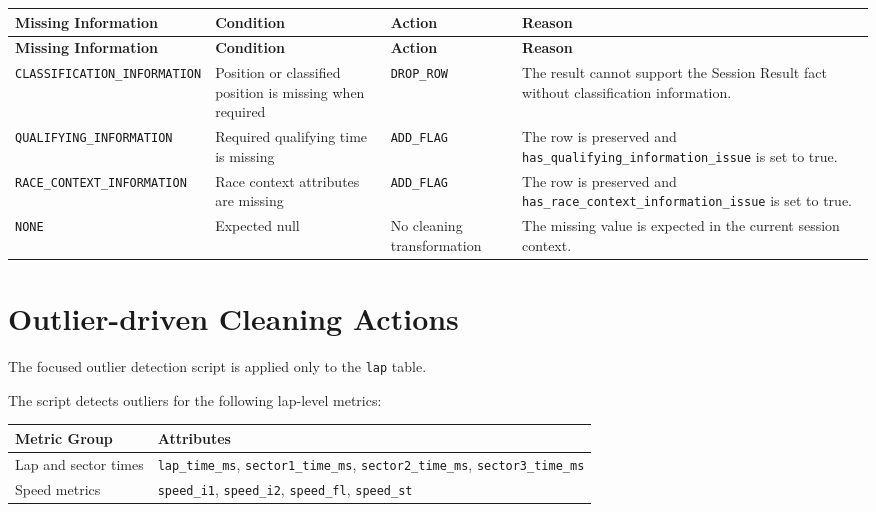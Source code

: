 \documentclass[a4paper,11pt]{article}
\newcommand{\codebreak}[1]{\nolinkurl{#1}}
\begin{document}
	\begin{longtable}{p{4.2cm}p{3.6cm}p{2.2cm}p{4.3cm}}
		\toprule
		\textbf{Missing Information} & \textbf{Condition} & \textbf{Action} & \textbf{Reason} \\
		\midrule
		\endfirsthead
		
		\toprule
		\textbf{Missing Information} & \textbf{Condition} & \textbf{Action} & \textbf{Reason} \\
		\midrule
		\endhead
		
		\codebreak{CLASSIFICATION_INFORMATION}
		& Position or classified position is missing when required
		& \texttt{DROP\_ROW}
		& The result cannot support the Session Result fact without classification information. \\
		\midrule
		
		\codebreak{QUALIFYING_INFORMATION}
		& Required qualifying time is missing
		& \texttt{ADD\_FLAG}
		& The row is preserved and \texttt{has\_qualifying\_information\_issue} is set to true. \\
		\midrule
		
		\codebreak{RACE_CONTEXT_INFORMATION}
		& Race context attributes are missing
		& \texttt{ADD\_FLAG}
		& The row is preserved and \texttt{has\_race\_context\_information\_issue} is set to true. \\
		\midrule
		
		\texttt{NONE}
		& Expected null
		& No cleaning transformation
		& The missing value is expected in the current session context. \\
		\bottomrule
	\end{longtable}
	
	\section{Outlier-driven Cleaning Actions}
	
	The focused outlier detection script is applied only to the \texttt{lap} table.
	
	The script detects outliers for the following lap-level metrics:
	
	\begin{table}[H]
		\centering
		\small
		\begin{tabular}{p{5cm}p{8cm}}
			\toprule
			\textbf{Metric Group} & \textbf{Attributes} \\
			\midrule
			
			Lap and sector times
			& \texttt{lap\_time\_ms}, \texttt{sector1\_time\_ms},
			\texttt{sector2\_time\_ms}, \texttt{sector3\_time\_ms} \\
			\midrule
			
			Speed metrics
			& \texttt{speed\_i1}, \texttt{speed\_i2},
			\texttt{speed\_fl}, \texttt{speed\_st} \\
			
			\bottomrule
		\end{tabular}
	\end{table}
	
\end{document}
